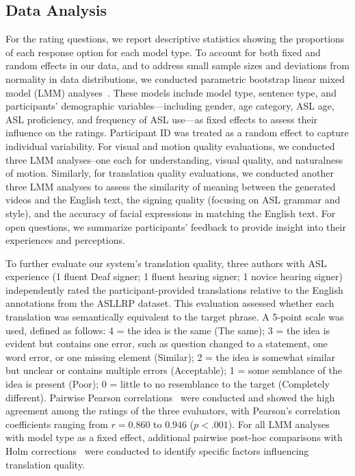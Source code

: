 

\subsection{Data Analysis}

For the rating questions, we report descriptive statistics showing the proportions of each response option for each model type. To account for both fixed and random effects in our data, and to address small sample sizes and deviations from normality in data distributions, we conducted parametric bootstrap linear mixed model (LMM) analyses~\cite{davison1997bootstrap,pinheiro2006mixed}. These models include model type, sentence type, and participants' demographic variables---including gender, age category, ASL age, ASL proficiency, and frequency of ASL use---as fixed effects to assess their influence on the ratings. Participant ID was treated as a random effect to capture individual variability. For visual and motion quality evaluations, we conducted three LMM analyses--one each for understanding, visual quality, and naturalness of motion. Similarly, for translation quality evaluations, we conducted another three LMM analyses to assess the similarity of meaning between the generated videos and the English text, the signing quality (focusing on ASL grammar and style), and the accuracy of facial expressions in matching the English text. For open questions, we summarize participants' feedback to provide insight into their experiences and perceptions.

To further evaluate our system's translation quality, three authors with ASL experience (1 fluent Deaf signer; 1 fluent hearing signer; 1 novice hearing signer) independently rated the participant-provided translations relative to the English annotations from the ASLLRP dataset. This evaluation assessed whether each translation was semantically equivalent to the target phrase. A 5-point scale was used, defined as follows: 4 = the idea is the same (The same); 3 = the idea is evident but contains one error, such as question changed to a statement, one word error, or one missing element (Similar); 2 = the idea is somewhat similar but unclear or contains multiple errors (Acceptable); 1 = some semblance of the idea is present (Poor); 0 = little to no resemblance to the target (Completely different). Pairwise Pearson correlations~\cite{lee1988thirteen} were conducted and showed the high agreement among the ratings of the three evaluators, with Pearson's correlation coefficients ranging from $r = 0.860$ to $0.946$ ($p < .001$). For all LMM analyses with model type as a fixed effect, additional pairwise post-hoc comparisons with Holm corrections~\cite{holm1979simple} were conducted to identify specific factors influencing translation quality.

